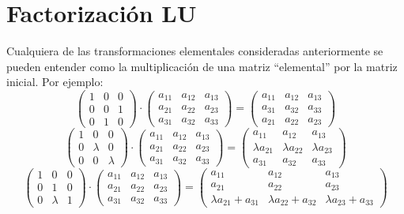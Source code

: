  \section{Factorizaci{\'o}n LU}
 \begin{obs}
 Cualquiera de las transformaciones elementales consideradas anteriormente se pueden entender como la multiplicación de una matriz ``elemental'' por la matriz inicial. Por ejemplo:
 $$\begin{pmatrix}
    1&0&0\\
    0&0&1\\
    0&1&0
 \end{pmatrix}\cdot\begin{pmatrix}
    a_{11}&a_{12}&a_{13}\\
    a_{21}&a_{22}&a_{23}\\
    a_{31}&a_{32}&a_{33}
 \end{pmatrix}=
 \begin{pmatrix}
    a_{11}&a_{12}&a_{13}\\
    a_{31}&a_{32}&a_{33}\\
    a_{21}&a_{22}&a_{23}
 \end{pmatrix}$$
$$\begin{pmatrix}
    1&0&0\\
    0&\lambda&0\\
    0&0&\lambda
 \end{pmatrix}\cdot\begin{pmatrix}
    a_{11}&a_{12}&a_{13}\\
    a_{21}&a_{22}&a_{23}\\
    a_{31}&a_{32}&a_{33}
 \end{pmatrix}=
 \begin{pmatrix}
    a_{11}&a_{12}&a_{13}\\
    \lambda a_{21}&\lambda a_{22}&\lambda a_{23}\\
    a_{31}&a_{32}&a_{33}
 \end{pmatrix}$$
 $$\begin{pmatrix}
    1&0&0\\
    0&1&0\\
    0&\lambda&1
 \end{pmatrix}\cdot\begin{pmatrix}
    a_{11}&a_{12}&a_{13}\\
    a_{21}&a_{22}&a_{23}\\
    a_{31}&a_{32}&a_{33}
 \end{pmatrix}=
 \begin{pmatrix}
    a_{11}&a_{12}&a_{13}\\
     a_{21}&a_{22}&a_{23}\\
    \lambda a_{21}+a_{31}&\lambda a_{22}+a_{32}&\lambda a_{23}+a_{33}
 \end{pmatrix}$$
 \end{obs}
